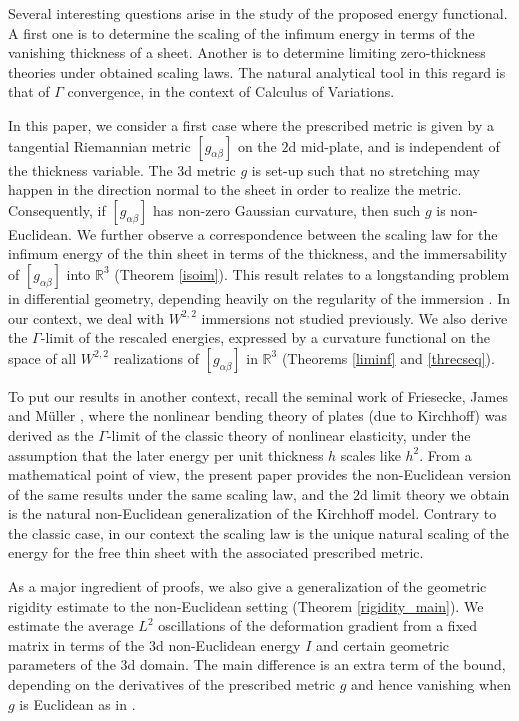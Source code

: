 \documentclass[leqno,twoside, 11pt]{amsart}
\theoremstyle{plain}
\theoremstyle{definition}
\numberwithin{equation}{section}
\numberwithin{figure}{section}
\begin{document}
Several interesting questions arise in the study of the proposed energy
functional. A first one is to determine the scaling of the infimum energy
in terms of the vanishing thickness of a sheet.
Another is to determine limiting zero-thickness
theories under obtained scaling laws. The natural
analytical tool in this regard is that of $\Gamma$ convergence,
in the context of Calculus of Variations.

In this paper, we consider a first case where the prescribed metric  
is given by a tangential Riemannian metric $[g_{\alpha\beta}]$
on the $2$d mid-plate, and is independent of the thickness variable.
The $3$d metric $g$ is set-up such that no stretching may happen
in the direction normal to the sheet in order to realize the metric.
Consequently, if $[g_{\alpha\beta}]$
has non-zero Gaussian curvature, then such $g$ is non-Euclidean.
We further observe a correspondence between
the scaling law for the infimum energy of the thin sheet in terms
of the thickness, and the immersability of  $[g_{\alpha\beta}]$ into $\mathbb R^3$
(Theorem \ref{isoim}).
This result relates to a  longstanding problem in differential geometry, 
depending heavily on the regularity of the immersion \cite{kuiper, HH}.
In our context, we deal with $W^{2,2}$ immersions not studied previously.
We also derive the $\Gamma$-limit of the rescaled energies,
expressed by a curvature functional
on the space of all $W^{2,2}$ realizations of $[g_{\alpha\beta}]$ in 
$\mathbb R^3$ (Theorems \ref{liminf} and \ref{threcseq}).

To put our results in another context, recall the seminal work of Friesecke,
James and M\"uller \cite{FJMgeo}, where the nonlinear bending theory
of plates (due to Kirchhoff) was derived as the $\Gamma$-limit of
the classic theory of nonlinear elasticity, under the assumption that
the later energy per unit thickness $h$ scales like $h^2$.
From a mathematical point of view, the present paper provides the non-Euclidean
version of the same results under the same scaling law, and
the $2$d limit theory we obtain is the natural
non-Euclidean generalization of the Kirchhoff model.
Contrary to the classic case, in our context the scaling law is the unique 
natural scaling of the energy for
the free thin sheet with the associated prescribed metric.

As a major ingredient of proofs, we also give a generalization of the geometric 
rigidity estimate \cite{FJMgeo} to the non-Euclidean setting (Theorem
\ref{rigidity_main}). We estimate the average $L^2$ oscillations 
of the deformation gradient from a fixed matrix in terms of the $3$d 
non-Euclidean energy $I$ and certain geometric parameters of the $3$d domain.
The main difference is an extra term of the bound, depending on
the derivatives of the prescribed metric $g$ and hence vanishing when $g$
is Euclidean as in \cite{FJMgeo}.
\end{document}
